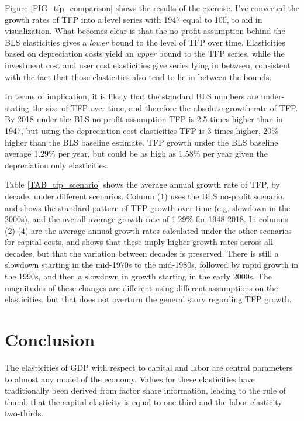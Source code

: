 \documentclass[11pt]{article}
\begin{document}
Figure \ref{FIG_tfp_comparison} shows the results of the exercise. I've converted the growth rates of TFP into a level series with 1947 equal to 100, to aid in visualization. What becomes clear is that the no-profit assumption behind the BLS elasticities gives a \textit{lower} bound to the level of TFP over time. Elasticities based on depreciation costs yield an \textit{upper} bound to the TFP series, while the investment cost and user cost elasticities give series lying in between, consistent with the fact that those elasticities also tend to lie in between the bounds. 

In terms of implication, it is likely that the standard BLS numbers are under-stating the size of TFP over time, and therefore the absolute growth rate of TFP. By 2018 under the BLS no-profit assumption TFP is 2.5 times higher than in 1947, but using the depreciation cost elasticities TFP is 3 times higher, 20\% higher than the BLS baseline estimate. TFP growth under the BLS baseline average 1.29\% per year, but could be as high as 1.58\% per year given the depreciation only elasticities.

Table \ref{TAB_tfp_scenario} shows the average annual growth rate of TFP, by decade, under different scenarios. Column (1) uses the BLS no-profit scenario, and shows the standard pattern of TFP growth over time (e.g. slowdown in the 2000s), and the overall average growth rate of 1.29\% for 1948-2018. In columns (2)-(4) are the average annual growth rates calculated under the other scenarios for capital costs, and shows that these imply higher growth rates across all decades, but that the variation between decades is preserved. There is still a slowdown starting in the mid-1970s to the mid-1980s, followed by rapid growth in the 1990s, and then a slowdown in growth starting in the early 2000s. The magnitudes of these changes are different using different assumptions on the elasticities, but that does not overturn the general story regarding TFP growth.

\section{Conclusion}
The elasticities of GDP with respect to capital and labor are central parameters to almost any model of the economy. Values for these elasticities have traditionally been derived from factor share information, leading to the rule of thumb that the capital elasticity is equal to one-third and the labor elasticity two-thirds. 
\end{document}
